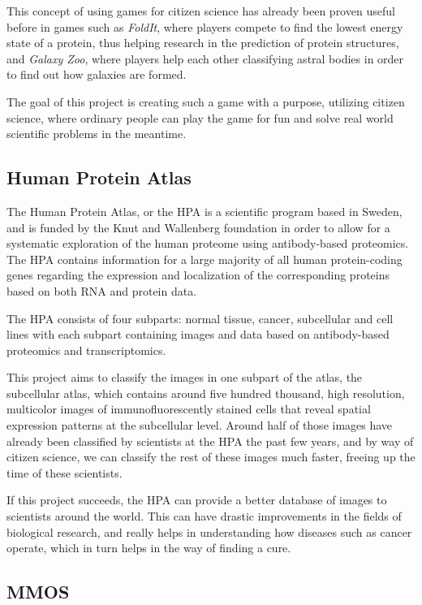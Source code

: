	This concept of using games for citizen science has already been proven useful before in games such as \emph{FoldIt}, where players compete to find the lowest energy state of a protein, thus helping research in the prediction of protein structures, and \emph{Galaxy Zoo}, where players help each other classifying astral bodies in order to find out how galaxies are formed.

	The goal of this project is creating such a game with a purpose, utilizing citizen science, where ordinary people can play the game for fun and solve real world scientific problems in the meantime.


\subsection{Human Protein Atlas}
	The Human Protein Atlas, or the HPA is a scientific program based in Sweden, and is funded by the Knut and Wallenberg foundation in order to allow for a systematic exploration of the human proteome using antibody-based proteomics. The HPA contains information for a large majority of all human protein-coding genes regarding the expression and localization of the corresponding proteins based on both RNA and protein data.

	The HPA consists of four subparts: normal tissue, cancer, subcellular and cell lines with each subpart containing images and data based on antibody-based proteomics and transcriptomics.

	This project aims to classify the images in one subpart of the atlas, the subcellular atlas, which contains around five hundred thousand, high resolution, multicolor images of immunofluorescently stained cells that reveal spatial expression patterns at the subcellular level. Around half of those images have already been classified by scientists at the HPA the past few years, and by way of citizen science, we can classify the rest of these images much faster, freeing up the time of these scientists.

	If this project succeeds, the HPA can provide a better database of images to scientists around the world. This can have drastic improvements in the fields of biological research, and really helps in understanding how diseases such as cancer operate, which in turn helps in the way of finding a cure.

\subsection{MMOS}


